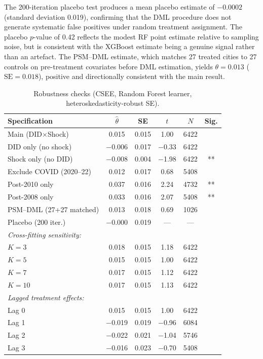 The 200-iteration placebo test produces a mean placebo estimate of
$-0.0002$ (standard deviation 0.019), confirming that the DML
procedure does not generate systematic false positives under random
treatment assignment. The placebo $p$-value of 0.42 reflects the
modest RF point estimate relative to sampling noise, but is
consistent with the XGBoost estimate being a genuine signal rather
than an artefact. The PSM--DML estimate, which matches 27 treated
cities to 27 controls on pre-treatment covariates before DML
estimation, yields $\theta = 0.013$ ($\mathrm{SE} = 0.018$), positive
and directionally consistent with the main result.

\begin{table}[htbp]
\centering
\caption{Robustness checks (CSEE, Random Forest learner,
heteroskedasticity-robust SE).}
\label{tab:robustness}
\small
\begin{tabular}{lccccc}
\toprule
Specification & $\hat{\theta}$ & SE & $t$ & $N$ & Sig. \\
\midrule
Main (DID$\times$Shock)        & 0.015 & 0.015 & 1.00 & 6422 & \\
DID only (no shock)            & $-$0.006 & 0.017 & $-$0.33 & 6422 & \\
Shock only (no DID)            & $-$0.008 & 0.004 & $-$1.98 & 6422 & ** \\
Exclude COVID (2020--22)       & 0.012 & 0.017 & 0.68 & 5408 & \\
Post-2010 only                 & 0.037 & 0.016 & 2.24 & 4732 & ** \\
Post-2008 only                 & 0.033 & 0.016 & 2.07 & 5408 & ** \\
PSM--DML (27+27 matched)        & 0.013 & 0.018 & 0.69 & 1026 & \\
Placebo (200 iter.)            & $-$0.000 & 0.019 & --- & --- & \\
\midrule
\multicolumn{6}{l}{\textit{Cross-fitting sensitivity:}} \\
$K=3$  & 0.018 & 0.015 & 1.18 & 6422 & \\
$K=5$  & 0.015 & 0.015 & 1.00 & 6422 & \\
$K=7$  & 0.017 & 0.015 & 1.12 & 6422 & \\
$K=10$ & 0.017 & 0.015 & 1.13 & 6422 & \\
\midrule
\multicolumn{6}{l}{\textit{Lagged treatment effects:}} \\
Lag 0 & 0.015 & 0.015 & 1.00 & 6422 & \\
Lag 1 & $-$0.019 & 0.019 & $-$0.96 & 6084 & \\
Lag 2 & $-$0.022 & 0.021 & $-$1.04 & 5746 & \\
Lag 3 & $-$0.016 & 0.023 & $-$0.70 & 5408 & \\
\bottomrule
\end{tabular}
\end{table}

